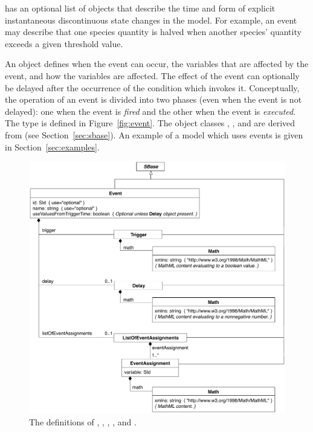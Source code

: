 \Model has an optional list of \Event objects that describe the
time and form of explicit instantaneous discontinuous state
changes in the model.  For example, an event may describe that one
species quantity is halved when another species' quantity exceeds a
given threshold value.

An \Event object defines when the event can occur, the variables
that are affected by the event, and how the variables are
affected.  The effect of the event can optionally be delayed after
the occurrence of the condition which invokes it.  Conceptually,
the operation of an event is divided into two phases (even when
the event is not delayed): one when the event is \emph{fired} and
the other when the event is \emph{executed}. The \Event type is
defined in Figure~\vref{fig:event}.  The object classes \Event,
\Trigger, \Delay and \EventAssignment are derived from \SBase{}
(see Section~\ref{sec:sbase}).  An example of a model which uses
events is given in Section~\ref{sec:examples}.

\begin{figure}[htb]
  \centering
  \small
  \includegraphics[scale=0.68]{figs/event-uml}
  \vspace*{-1ex}
  \caption{The definitions of \Event, \Trigger, \Delay,
    \EventAssignment, and \ListOfEventAssignments.}
  \label{fig:event}
\end{figure}


